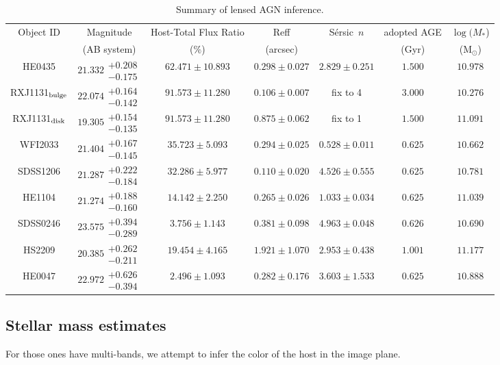 \documentclass[fleqn,usenatbib]{mnras}
\newcommand{\sersic}{S\'ersic}
\begin{document}
\begin{table}
\centering
     \begin{tabular}{ccccccc}
\hline
Object ID & Magnitude & Host-Total Flux Ratio & Reff & \sersic\ $n$ & adopted AGE & $\log (M_{*}$)  \\
 & (AB system) & ($\%$) & (arcsec) & & (Gyr) & (M$_{\odot}$) \\ \hline
HE0435 & $21.332\substack{+0.208\\-0.175}$ & $62.471\pm10.893$ & $0.298\pm0.027$ & $2.829\pm0.251$ & $1.500$ & $10.978$ \\
RXJ1131$_{\rm bulge}$ & $22.074\substack{+0.164\\-0.142}$ & $91.573\pm11.280$ & $0.106\pm0.007$ & fix to 4 & $3.000$ & $10.276$ \\
RXJ1131$_{\rm disk}$ & $19.305\substack{+0.154\\-0.135}$ & $91.573\pm11.280$ & $0.875\pm0.062$ & fix to 1 & $1.500$ & $11.091$ \\
WFI2033 & $21.404\substack{+0.167\\-0.145}$ & $35.723\pm5.093$ & $0.294\pm0.025$ & $0.528\pm0.011$ & $0.625$ & $10.662$ \\
SDSS1206 & $21.287\substack{+0.222\\-0.184}$ & $32.286\pm5.977$ & $0.110\pm0.020$ & $4.526\pm0.555$ & $0.625$ & $10.781$ \\
HE1104 & $21.274\substack{+0.188\\-0.160}$ & $14.142\pm2.250$ & $0.265\pm0.026$ & $1.033\pm0.034$ & $0.625$ & $11.039$ \\
SDSS0246 & $23.575\substack{+0.394\\-0.289}$ & $3.756\pm1.143$ & $0.381\pm0.098$ & $4.963\pm0.048$ & $0.626$ & $10.690$ \\
HS2209 & $20.385\substack{+0.262\\-0.211}$ & $19.454\pm4.165$ & $1.921\pm1.070$ & $2.953\pm0.438$ & $1.001$ & $11.177$ \\
HE0047 & $22.972\substack{+0.626\\-0.394}$ & $2.496\pm1.093$ & $0.282\pm0.176$ & $3.603\pm1.533$ & $0.625$ & $10.888$ \\
\hline
\end{tabular}
\caption{Summary of lensed AGN inference.}\label{data_set}    
\small
\end{table}


\subsection{Stellar mass estimates}
For those ones have multi-bands, we attempt to infer the color of the host in the image plane.
\end{document}
